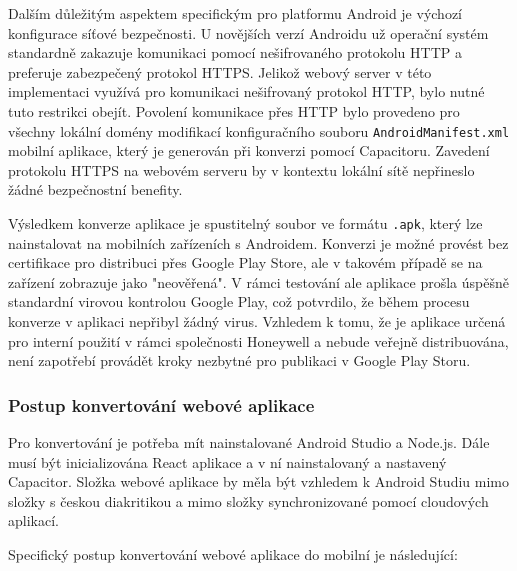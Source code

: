 Dalším důležitým aspektem specifickým pro platformu Android je výchozí konfigurace síťové bezpečnosti. U novějších verzí Androidu už operační systém standardně zakazuje komunikaci pomocí nešifrovaného protokolu HTTP a preferuje zabezpečený protokol HTTPS. Jelikož webový server v této implementaci využívá pro komunikaci nešifrovaný protokol HTTP, bylo nutné tuto restrikci obejít. Povolení komunikace přes HTTP bylo provedeno pro všechny lokální domény modifikací konfiguračního souboru \texttt{AndroidManifest.xml} mobilní aplikace, který je generován při konverzi pomocí Capacitoru. Zavedení protokolu HTTPS na webovém serveru by v kontextu lokální sítě nepřineslo žádné bezpečnostní benefity.
\cite{cleartextTraffic}

Výsledkem konverze aplikace je spustitelný soubor ve formátu \texttt{.apk}, který lze nainstalovat na mobilních zařízeních s Androidem. Konverzi je možné provést bez certifikace pro distribuci přes Google Play Store, ale v takovém případě se na zařízení zobrazuje jako "neověřená". V rámci testování ale aplikace prošla úspěšně standardní virovou kontrolou Google Play, což potvrdilo, že během procesu konverze v aplikaci nepřibyl žádný virus. Vzhledem k tomu, že je aplikace určená pro interní použití v rámci společnosti Honeywell a nebude veřejně distribuována, není zapotřebí provádět kroky nezbytné pro publikaci v Google Play Storu.

\subsubsection{Postup konvertování webové aplikace}

Pro konvertování je potřeba mít nainstalované Android Studio a Node.js. Dále musí být inicializována React aplikace a v ní nainstalovaný a nastavený Capacitor. Složka webové aplikace by měla být vzhledem k Android Studiu mimo složky s českou diakritikou a mimo složky synchronizované pomocí cloudových aplikací.

Specifický postup konvertování webové aplikace do mobilní je následující:

